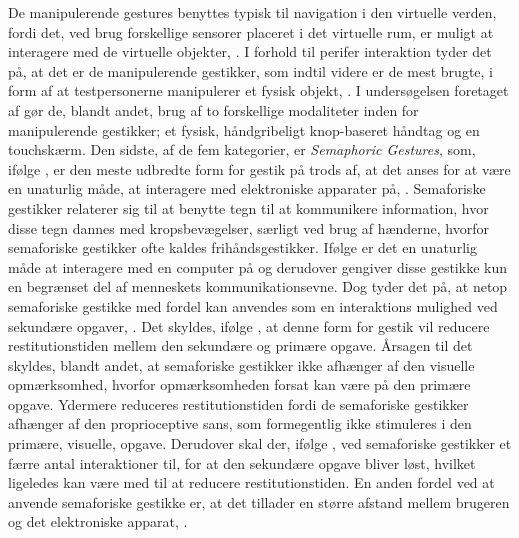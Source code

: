 De manipulerende gestures benyttes typisk til navigation i den virtuelle verden, fordi det, ved brug forskellige sensorer placeret i det virtuelle rum, er muligt at interagere med de virtuelle objekter, \parencite[ss. 14-15]{PDF:ATaxonomyOfGestures}. I forhold til perifer interaktion tyder det på, at det er de manipulerende gestikker, som indtil videre er de mest brugte, i form af at testpersonerne manipulerer et fysisk objekt, \parencite[s. 164]{PDF:ComparingInputModalities}. I undersøgelsen foretaget af \textcite[ss. 164-165]{PDF:ComparingInputModalities} gør de, blandt andet, brug af to forskellige modaliteter inden for manipulerende gestikker; et fysisk, håndgribeligt knop-baseret håndtag og en touchskærm.\blankline
%
Den sidste, af de fem kategorier, er \textit{Semaphoric Gestures}, som, ifølge \textcite[s. 6]{PDF:ATaxonomyOfGestures}, er den meste udbredte form for gestik på trods af, at det anses for at være en unaturlig måde, at interagere med elektroniske apparater på, \parencite[s. 1961]{PDF:AStudyOnTheUseOfSemaphoricGestures}. Semaforiske gestikker relaterer sig til at benytte tegn til at kommunikere information, hvor disse tegn dannes med kropsbevægelser, særligt ved brug af hænderne, hvorfor semaforiske gestikker ofte kaldes frihåndsgestikker. Ifølge \textcite[s. 1961]{PDF:AStudyOnTheUseOfSemaphoricGestures} er det en unaturlig måde at interagere med en computer på og derudover gengiver disse gestikke kun en begrænset del af menneskets kommunikationsevne. Dog tyder det på, at netop semaforiske gestikke med fordel kan anvendes som en interaktions mulighed ved sekundære opgaver, \parencite[s. 1961]{PDF:AStudyOnTheUseOfSemaphoricGestures}. Det skyldes, ifølge \textcite[s. 1964]{PDF:AStudyOnTheUseOfSemaphoricGestures}, at denne form for gestik vil reducere restitutionstiden mellem den sekundære og primære opgave. Årsagen til det skyldes, blandt andet, at semaforiske gestikker ikke afhænger af den visuelle opmærksomhed, hvorfor opmærksomheden forsat kan være på den primære opgave. Ydermere reduceres restitutionstiden fordi de semaforiske gestikker afhænger af den proprioceptive sans, som formegentlig ikke stimuleres i den primære, visuelle, opgave. Derudover skal der, ifølge \textcite[s. 1964]{PDF:AStudyOnTheUseOfSemaphoricGestures}, ved semaforiske gestikker et færre antal interaktioner til, for at den sekundære opgave bliver løst, hvilket ligeledes kan være med til at reducere restitutionstiden. En anden fordel ved at anvende semaforiske gestikke er, at det tillader en større afstand mellem brugeren og det elektroniske apparat, \parencite[s. 6]{PDF:ATaxonomyOfGestures}.    

